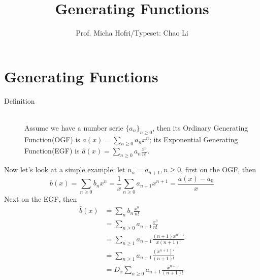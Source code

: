 \documentclass[11pt]{article}
\author{Prof. Micha Hofri/Typeset: Chao Li}
\title{Generating Functions}
\begin{document}
\maketitle
\section*{Generating Functions}
\begin{description}
\item[Definition] \hfill \\
Assume we have a number serie \(\{a_n\}_{n\geq 0}\), then its Ordinary
Generating Function(OGF) is \(a(x)=\sum_{n\geq 0}a_nx^n\); its Exponential
Generating Function(EGF) is \(\hat{a}(x)=\sum_{n\geq 0}a_n\frac{x^n}{n!}\).
\end{description}
Now let's look at a simple example: let \(n_n=a_{n+1}, n\geq 0\),
first on the OGF, then \\
\[
b(x)=\sum_{n\geq 0}b_nx^n=\frac{1}{x}\sum_{n\geq 0}a_{n+1}x^{n+1} =\frac{a(x)-a_0}{x}
\]
Next on the EGF, then\\
\begin{align*}
\hat{b}(x)&=\sum_nb_n\frac{x^n}{n!} \\
&=\sum_{n\geq 0}a_{n+1}\frac{x^n}{n!} \\
&=\sum_{n\geq 1}a_{n+1}\frac{(n+1)x^{n+1}}{x(n+1)!} \\
&=\sum_{n\geq 1}a_{n+1}\frac{(x^{n+1})'}{(n+1)!} \\
&=D_x\sum_{n\geq 0}a_{n+1}\frac{x^{n+1}}{(n+1)!}
\end{align*}
\end{document}
